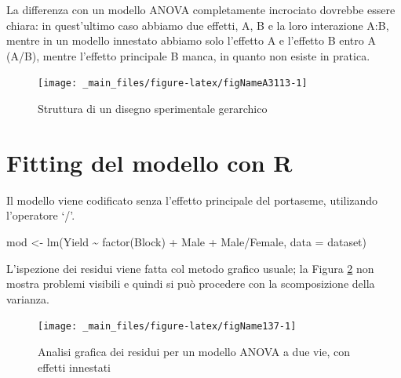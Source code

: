 \documentclass[a4paper,12pt,oneside]{book}
\newenvironment{Shaded}{\begin{snugshade}}{\end{snugshade}}
\newcommand{\SpecialCharTok}[1]{#1}
\newcommand{\OtherTok}[1]{#1}
\newcommand{\FunctionTok}[1]{#1}
\newcommand{\AttributeTok}[1]{#1}
\newcommand{\NormalTok}[1]{#1}
\begin{document}
La differenza con un modello ANOVA completamente incrociato dovrebbe essere chiara: in quest'ultimo caso abbiamo due effetti, A, B e la loro interazione A:B, mentre in un modello innestato abbiamo solo l'effetto A e l'effetto B entro A (A/B), mentre l'effetto principale B manca, in quanto non esiste in pratica.

\begin{figure}

{\centering \texttt{[image: \_main\_files/figure-latex/figNameA3113-1]} 

}

\caption{Struttura di un disegno sperimentale gerarchico}\label{fig:figNameA3113}
\end{figure}

\hypertarget{fitting-del-modello-con-r-1}{%
\section{Fitting del modello con R}\label{fitting-del-modello-con-r-1}}

Il modello viene codificato senza l'effetto principale del portaseme, utilizando l'operatore `/'.

\scriptsize

\begin{Shaded}
\begin{Highlighting}[]
\NormalTok{mod }\OtherTok{\textless{}{-}} \FunctionTok{lm}\NormalTok{(Yield }\SpecialCharTok{\textasciitilde{}} \FunctionTok{factor}\NormalTok{(Block) }\SpecialCharTok{+}\NormalTok{ Male }\SpecialCharTok{+}\NormalTok{ Male}\SpecialCharTok{/}\NormalTok{Female,}
          \AttributeTok{data =}\NormalTok{ dataset)}
\end{Highlighting}
\end{Shaded}

\normalsize

L'ispezione dei residui viene fatta col metodo grafico usuale; la Figura \ref{fig:figName137} non mostra problemi visibili e quindi si può procedere con la scomposizione della varianza.

\begin{figure}

{\centering \texttt{[image: \_main\_files/figure-latex/figName137-1]} 

}

\caption{Analisi grafica dei residui per un modello ANOVA a due vie, con effetti innestati}\label{fig:figName137}
\end{figure}
\end{document}

